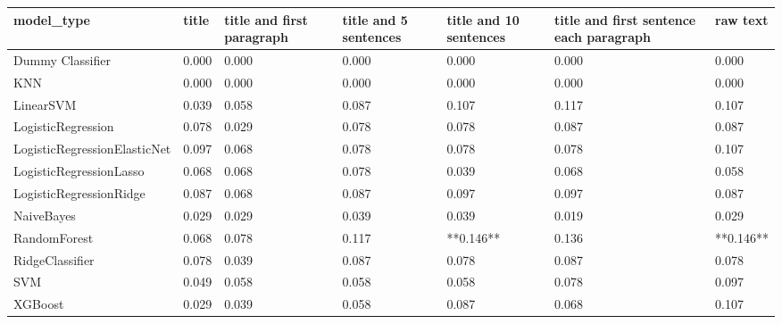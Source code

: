 \begin{tabular}{lllllll}
\toprule
                  model\_type & title & title and first paragraph & title and 5 sentences & title and 10 sentences & title and first sentence each paragraph &  raw text \\
\midrule
            Dummy Classifier & 0.000 &                     0.000 &                 0.000 &                  0.000 &                                   0.000 &     0.000 \\
                         KNN & 0.000 &                     0.000 &                 0.000 &                  0.000 &                                   0.000 &     0.000 \\
                   LinearSVM & 0.039 &                     0.058 &                 0.087 &                  0.107 &                                   0.117 &     0.107 \\
          LogisticRegression & 0.078 &                     0.029 &                 0.078 &                  0.078 &                                   0.087 &     0.087 \\
LogisticRegressionElasticNet & 0.097 &                     0.068 &                 0.078 &                  0.078 &                                   0.078 &     0.107 \\
     LogisticRegressionLasso & 0.068 &                     0.068 &                 0.078 &                  0.039 &                                   0.068 &     0.058 \\
     LogisticRegressionRidge & 0.087 &                     0.068 &                 0.087 &                  0.097 &                                   0.097 &     0.087 \\
                  NaiveBayes & 0.029 &                     0.029 &                 0.039 &                  0.039 &                                   0.019 &     0.029 \\
                RandomForest & 0.068 &                     0.078 &                 0.117 &              **0.146** &                                   0.136 & **0.146** \\
             RidgeClassifier & 0.078 &                     0.039 &                 0.087 &                  0.078 &                                   0.087 &     0.078 \\
                         SVM & 0.049 &                     0.058 &                 0.058 &                  0.058 &                                   0.078 &     0.097 \\
                     XGBoost & 0.029 &                     0.039 &                 0.058 &                  0.087 &                                   0.068 &     0.107 \\
\bottomrule
\end{tabular}
